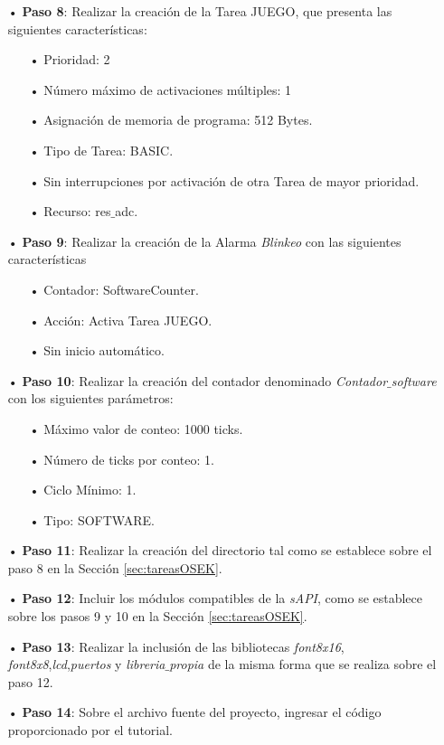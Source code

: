 \documentclass[12pt,letterpaper]{article}
\begin{document}
\begin{enumerate}
\item[•]\textbf{Paso 8}: Realizar la creación de la Tarea JUEGO, que presenta las siguientes características:
\begin{enumerate}
\item[•]Prioridad: 2
\item[•]Número máximo de activaciones múltiples: 1
\item[•]Asignación de memoria de programa: 512 Bytes.
\item[•]Tipo de Tarea: BASIC.
\item[•]Sin interrupciones por activación de otra Tarea de mayor prioridad.
\item[•]Recurso: res$\_$adc.
\end{enumerate}

\item[•]\textbf{Paso 9}: Realizar la creación de la Alarma \textit{Blinkeo} con las siguientes características
\begin{enumerate}
\item[•]Contador: SoftwareCounter.
\item[•]Acción: Activa Tarea JUEGO.
\item[•]Sin inicio automático.
\end{enumerate}

\item[•]\textbf{Paso 10}: Realizar la creación del contador denominado \textit{Contador$\_$software} con los siguientes parámetros:
\begin{enumerate}
\item[•]Máximo valor de conteo: 1000 ticks.
\item[•]Número de ticks por conteo: 1. 
\item[•]Ciclo Mínimo: 1.
\item[•]Tipo: SOFTWARE.
\end{enumerate}

\item[•]\textbf{Paso 11}: Realizar la creación del directorio tal como se establece sobre el paso 8 en la Sección \ref{sec:tareasOSEK}.

\item[•]\textbf{Paso 12}: Incluir los módulos compatibles de la \textit{sAPI}, como se establece sobre los pasos 9 y 10 en la Sección \ref{sec:tareasOSEK}.

\item[•]\textbf{Paso 13}: Realizar la inclusión de las bibliotecas \textit{font8x16}, \textit{font8x8},\textit{lcd},\textit{puertos} y \textit{libreria$\_$propia} de la misma forma que se realiza sobre el paso 12.

\item[•]\textbf{Paso 14}: Sobre el archivo fuente del proyecto, ingresar el código proporcionado por el tutorial.
\end{enumerate}
\end{document}
